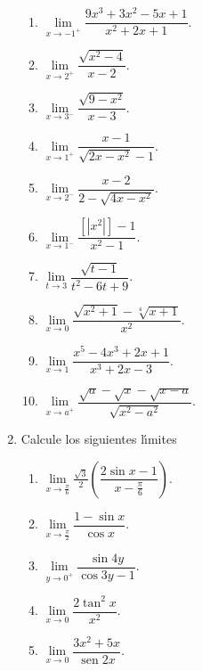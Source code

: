 \begin{enumerate}
\begin{enumerate}
\item $\lim\limits_{x\rightarrow-1^{+}}\dfrac{9x^{3}+3x^{2}-5x+1}{x^{2}%
+2x+1}.$

\item $\lim\limits_{x\rightarrow2^{+}}\dfrac{\sqrt{x^{2}-4}}{x-2}.$

\item $\lim\limits_{x\rightarrow3^{-}}\dfrac{\sqrt{9-x^{2}}}{x-3}.$

\item $\lim\limits_{x\rightarrow1^{+}}\dfrac{x-1}{\sqrt{2x-x^{2}}-1}.$

\item $\lim\limits_{x\rightarrow2^{-}}\dfrac{x-2}{2-\sqrt{4x-x^{2}}}.$

\item $\lim\limits_{x\rightarrow1^{-}}\dfrac{\left[  \left\vert x^{2}%
\right\vert \right]  -1}{x^{2}-1}.$

\item $\lim\limits_{t\rightarrow3}\dfrac{\sqrt{t-1}}{t^{2}-6t+9}.$

\item $\lim\limits_{x\rightarrow0}\dfrac{\sqrt{x^{2}+1}-\sqrt[4]{x+1}}{x^{2}%
}.$

\item $\lim\limits_{x\rightarrow1}\dfrac{x^{5}-4x^{3}+2x+1}{x^{3}+2x-3}.$

\item $\lim\limits_{x\rightarrow a^{+}}\dfrac{\sqrt{a}-\sqrt{x}-\sqrt{x-a}%
}{\sqrt{x^{2}-a^{2}}}.$
\end{enumerate}

\item Calcule los siguientes l\'{\i}mites

\begin{enumerate}
\item $\lim\limits_{x\rightarrow\frac{\pi}{6}}\frac{\sqrt{3}}{2}\left(
\dfrac{2\sin x-1}{x-\frac{\pi}{6}}\right)  .$

\item $\lim\limits_{x\rightarrow\frac{\pi}{2}}\dfrac{1-\sin x}{\cos x}.$

\item $\lim\limits_{y\rightarrow0^{+}}\dfrac{\sin4y}{\cos3y-1}.$

\item $\lim\limits_{x\rightarrow0}\dfrac{2\tan^{2}x}{x^{2}}.$

\item $\lim\limits_{x\rightarrow0}\dfrac{3x^{2}+5x}{\operatorname{sen}2x}.$


\end{enumerate}
\end{enumerate}
